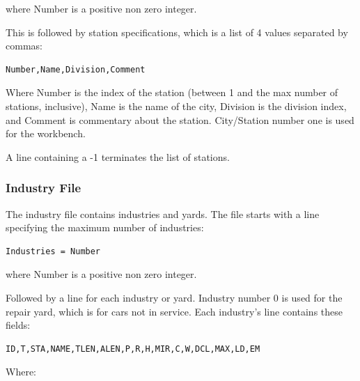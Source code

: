 where Number is a positive non zero integer.

This is followed by station specifications, which is a list of 4 values
separated by commas:

\begin{verbatim}
Number,Name,Division,Comment
\end{verbatim}

Where Number is the index of the station (between 1 and the max number
of stations, inclusive), Name is the name of the city, Division is the
division index, and Comment is commentary about the station. 
City/Station number one is used for the workbench.

A line containing a -1 terminates the list of stations.

\subsubsection{Industry File}

The industry file contains industries and yards.  The file starts with a
line specifying the maximum number of industries:

\begin{verbatim}
Industries = Number
\end{verbatim}

where Number is a positive non zero integer.

Followed by a line for each industry or yard.  Industry number 0 is
used for the repair yard, which is for cars not in service.  Each
industry's line contains these fields:

\begin{verbatim}
ID,T,STA,NAME,TLEN,ALEN,P,R,H,MIR,C,W,DCL,MAX,LD,EM
\end{verbatim}

Where:

